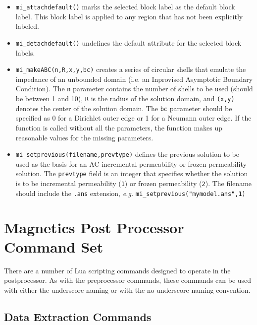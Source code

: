\begin{itemize}
\item{\tt mi\_attachdefault()} marks the
selected block label as the default block label.  This block label
is applied to any region that has not been explicitly labeled.

\item{\tt mi\_detachdefault()} undefines the default
attribute for the selected block labels.

\item{\tt mi\_makeABC(n,R,x,y,bc)} creates a series of circular shells that emulate the
impedance of an unbounded domain (i.e. an Inprovised Asymptotic Boundary
Condition).  The {\tt n} parameter contains the number of shells to be used
(should be between 1 and 10), {\tt R} is the radius of the solution domain, and
{\tt (x,y)} denotes the center of the solution domain.  The {\tt bc} parameter should
be specified as 0 for a Dirichlet outer edge or 1 for a Neumann outer edge.
If the function is called without all the parameters, the function makes up
reasonable values for the missing parameters. 

\item{\tt mi\_setprevious(filename,prevtype)} defines the previous solution to be used as the basis for an AC incremental
permeability or frozen permeability solution.  The {\tt prevtype} field is an integer that specifies whether the solution 
is to be incremental permeability ({\tt 1}) or frozen permeability ({\tt 2}). The filename should include the {\tt .ans}
extension, {\em e.g.} {\tt mi\_setprevious("mymodel.ans",1)}

\end{itemize}

\section{Magnetics Post Processor Command Set}

There are a number of Lua scripting commands designed to operate in
the postprocessor.  As with the preprocessor commands, these
commands can be used with either the underscore naming or with the
no-underscore naming convention.

\subsection{Data Extraction Commands}

